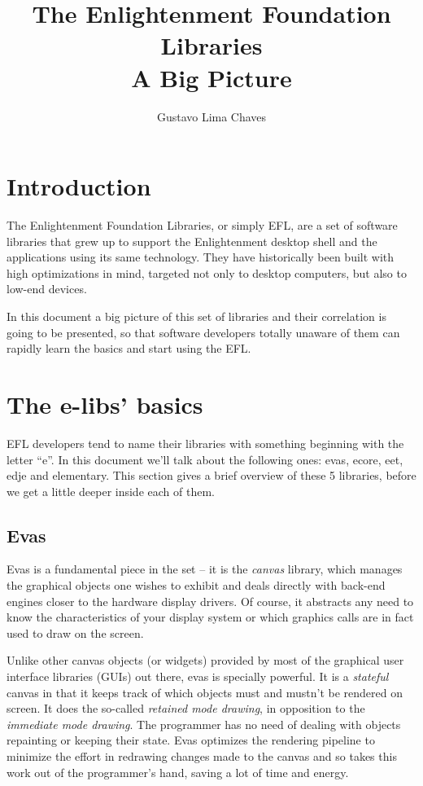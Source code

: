 \documentclass[a4paper]{profusion}
\title{The Enlightenment Foundation Libraries\\
  \normalsize{A Big Picture}}
\author{Gustavo Lima Chaves}
\begin{document}
\maketitle
\tableofcontents

\section{Introduction}

The Enlightenment Foundation Libraries, or simply EFL, are a set of
software libraries that grew up to support the Enlightenment desktop
shell and the applications using its same technology. They have
historically been built with high optimizations in mind, targeted not
only to desktop computers, but also to low-end devices.

In this document a big picture of this set of libraries and their
correlation is going to be presented, so that software developers
totally unaware of them can rapidly learn the basics and start using
the EFL.

\section{The e-libs' basics}

EFL developers tend to name their libraries with something beginning
with the letter ``e''. In this document we'll talk about the following
ones: evas, ecore, eet, edje and elementary. This section gives a
brief overview of these 5 libraries, before we get a little deeper
inside each of them.

\subsection{Evas}

Evas is a fundamental piece in the set -- it is the \emph{canvas}
library, which manages the graphical objects one wishes to exhibit and
deals directly with back-end engines closer to the hardware display
drivers. Of course, it abstracts any need to know the characteristics
of your display system or which graphics calls are in fact used to
draw on the screen.

Unlike other canvas objects (or widgets) provided by most of the
graphical user interface libraries (GUIs) out there, evas is specially
powerful. It is a \emph{stateful} canvas in that it keeps track of
which objects must and mustn't be rendered on screen. It does the
so-called \emph{retained mode drawing}, in opposition to the
\emph{immediate mode drawing}. The programmer has no need of dealing
with objects repainting or keeping their state. Evas optimizes the
rendering pipeline to minimize the effort in redrawing changes made to
the canvas and so takes this work out of the programmer's hand, saving
a lot of time and energy.
\end{document}
